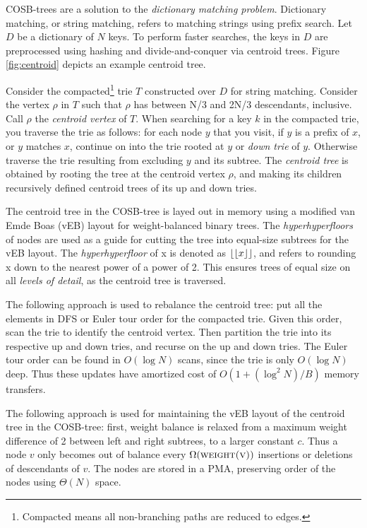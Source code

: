 \documentclass[preprint]{style}
\begin{document}
COSB-trees are a solution to the \textit{dictionary matching problem}.
Dictionary matching, or string matching, refers to matching strings using
prefix search. Let $D$ be a dictionary of $N$ keys. To perform faster searches,
the keys in $D$ are preprocessed using hashing and divide-and-conquer via
centroid trees. Figure \ref{fig:centroid} depicts an example centroid tree.

Consider the compacted\footnote{Compacted means all non-branching paths are
reduced to edges.} trie $T$ constructed over $D$ for string matching.  Consider
the vertex $\rho$ in $T$ such that $\rho$ has between N/3 and 2N/3 descendants,
inclusive. Call $\rho$ the \emph{centroid vertex} of $T$. When searching for a
key $k$ in the compacted trie, you traverse the trie as follows: for each node
$y$ that you visit, if $y$ is a prefix of $x$, or $y$ matches $x$, continue on
into the trie rooted at $y$ or \emph{down trie} of $y$. Otherwise traverse the
trie resulting from excluding $y$ and its subtree. The \emph{centroid tree} is
obtained by rooting the tree at the centroid vertex $\rho$, and making its
children recursively defined centroid trees of its up and down tries. 

The centroid tree in the COSB-tree is layed out in memory using a modified van
Emde Boas (vEB) layout for weight-balanced binary trees. The
\emph{hyperhyperfloors} of nodes are used as a guide for cutting the tree into
equal-size subtrees for the vEB layout. The \emph{hyperhyperfloor} of x is
denoted as $\lfloor\lfloor{}x\rfloor\rfloor{}$, and refers to rounding x down to
the nearest power of a power of 2. This ensures trees of equal size on all
\emph{levels of detail}, as the centroid tree is traversed.

The following approach is used to rebalance the centroid tree: put all the
elements in DFS or Euler tour order for the compacted trie. Given this order,
scan the trie to identify the centroid vertex. Then partition the trie into its
respective up and down tries, and recurse on the up and down tries. The Euler
tour order can be found in $O(\log{N})$ scans, since the trie is only
$O(\log{N})$ deep. Thus these updates have amortized cost of
$O(1+(\log^{2}{N})/B)$ memory transfers.

The following approach is used for maintaining the vEB layout of the centroid
tree in the COSB-tree: first, weight balance is relaxed from a maximum weight
difference of 2 between left and right subtrees, to a larger constant $c$. Thus
a node $v$ only becomes out of balance every $\Omega(\textsc{weight(v)})$
insertions or deletions of descendants of $v$. The nodes are stored in a PMA,
preserving order of the nodes using $\Theta(N)$ space.
\end{document}
